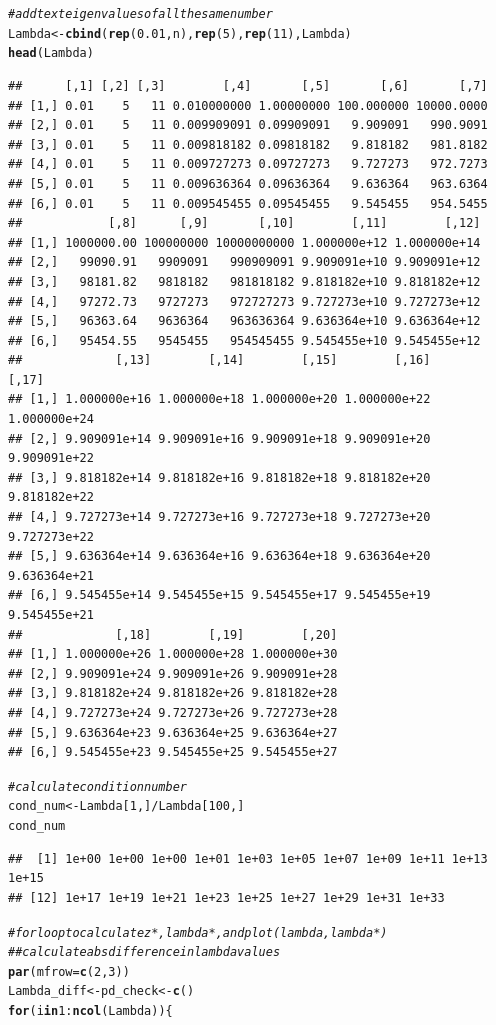 \documentclass{article}\usepackage[]{graphicx}\usepackage[]{color}
\makeatletter
\newcommand{\hlnum}[1]{\textcolor[rgb]{0.686,0.059,0.569}{#1}}%
\newcommand{\hlcom}[1]{\textcolor[rgb]{0.678,0.584,0.686}{\textit{#1}}}%
\newcommand{\hlopt}[1]{\textcolor[rgb]{0,0,0}{#1}}%
\newcommand{\hlstd}[1]{\textcolor[rgb]{0.345,0.345,0.345}{#1}}%
\newcommand{\hlkwa}[1]{\textcolor[rgb]{0.161,0.373,0.58}{\textbf{#1}}}%
\newcommand{\hlkwb}[1]{\textcolor[rgb]{0.69,0.353,0.396}{#1}}%
\newcommand{\hlkwc}[1]{\textcolor[rgb]{0.333,0.667,0.333}{#1}}%
\newcommand{\hlkwd}[1]{\textcolor[rgb]{0.737,0.353,0.396}{\textbf{#1}}}%
\newenvironment{kframe}{%
 \def\at@end@of@kframe{}%
 \ifinner\ifhmode%
  \def\at@end@of@kframe{\end{minipage}}%
  \begin{minipage}{\columnwidth}%
 \fi\fi%
 \def\FrameCommand##1{\hskip\@totalleftmargin \hskip-\fboxsep
 \colorbox{shadecolor}{##1}\hskip-\fboxsep
     \hskip-\linewidth \hskip-\@totalleftmargin \hskip\columnwidth}%
 \MakeFramed {\advance\hsize-\width
   \@totalleftmargin\z@ \linewidth\hsize
   \@setminipage}}%
 {\par\unskip\endMakeFramed%
 \at@end@of@kframe}
\newenvironment{knitrout}{}{} %
\makeatother
\begin{document}
\begin{knitrout}
\begin{kframe}
\begin{alltt}
\hlcom{#add text eigen values of all the same number}
\hlstd{Lambda} \hlkwb{<-} \hlkwd{cbind}\hlstd{(}\hlkwd{rep}\hlstd{(}\hlnum{0.01}\hlstd{, n),} \hlkwd{rep}\hlstd{(}\hlnum{5}\hlstd{),} \hlkwd{rep}\hlstd{(}\hlnum{11}\hlstd{), Lambda)}
\hlkwd{head}\hlstd{(Lambda)}
\end{alltt}
\begin{verbatim}
##      [,1] [,2] [,3]        [,4]       [,5]       [,6]       [,7]
## [1,] 0.01    5   11 0.010000000 1.00000000 100.000000 10000.0000
## [2,] 0.01    5   11 0.009909091 0.09909091   9.909091   990.9091
## [3,] 0.01    5   11 0.009818182 0.09818182   9.818182   981.8182
## [4,] 0.01    5   11 0.009727273 0.09727273   9.727273   972.7273
## [5,] 0.01    5   11 0.009636364 0.09636364   9.636364   963.6364
## [6,] 0.01    5   11 0.009545455 0.09545455   9.545455   954.5455
##            [,8]      [,9]       [,10]        [,11]        [,12]
## [1,] 1000000.00 100000000 10000000000 1.000000e+12 1.000000e+14
## [2,]   99090.91   9909091   990909091 9.909091e+10 9.909091e+12
## [3,]   98181.82   9818182   981818182 9.818182e+10 9.818182e+12
## [4,]   97272.73   9727273   972727273 9.727273e+10 9.727273e+12
## [5,]   96363.64   9636364   963636364 9.636364e+10 9.636364e+12
## [6,]   95454.55   9545455   954545455 9.545455e+10 9.545455e+12
##             [,13]        [,14]        [,15]        [,16]        [,17]
## [1,] 1.000000e+16 1.000000e+18 1.000000e+20 1.000000e+22 1.000000e+24
## [2,] 9.909091e+14 9.909091e+16 9.909091e+18 9.909091e+20 9.909091e+22
## [3,] 9.818182e+14 9.818182e+16 9.818182e+18 9.818182e+20 9.818182e+22
## [4,] 9.727273e+14 9.727273e+16 9.727273e+18 9.727273e+20 9.727273e+22
## [5,] 9.636364e+14 9.636364e+16 9.636364e+18 9.636364e+20 9.636364e+21
## [6,] 9.545455e+14 9.545455e+15 9.545455e+17 9.545455e+19 9.545455e+21
##             [,18]        [,19]        [,20]
## [1,] 1.000000e+26 1.000000e+28 1.000000e+30
## [2,] 9.909091e+24 9.909091e+26 9.909091e+28
## [3,] 9.818182e+24 9.818182e+26 9.818182e+28
## [4,] 9.727273e+24 9.727273e+26 9.727273e+28
## [5,] 9.636364e+23 9.636364e+25 9.636364e+27
## [6,] 9.545455e+23 9.545455e+25 9.545455e+27
\end{verbatim}
\begin{alltt}
\hlcom{#calculate condition  number}
\hlstd{cond_num} \hlkwb{<-} \hlstd{Lambda[}\hlnum{1}\hlstd{, ]} \hlopt{/} \hlstd{Lambda[}\hlnum{100}\hlstd{, ]}
\hlstd{cond_num}
\end{alltt}
\begin{verbatim}
##  [1] 1e+00 1e+00 1e+00 1e+01 1e+03 1e+05 1e+07 1e+09 1e+11 1e+13 1e+15
## [12] 1e+17 1e+19 1e+21 1e+23 1e+25 1e+27 1e+29 1e+31 1e+33
\end{verbatim}
\begin{alltt}
\hlcom{#for loop to calculate z*, lambda*, and plot(lambda, lambda*)}
\hlcom{##calculate abs difference in lambda values}
\hlkwd{par}\hlstd{(}\hlkwc{mfrow} \hlstd{=} \hlkwd{c}\hlstd{(}\hlnum{2}\hlstd{,} \hlnum{3}\hlstd{))}
\hlstd{Lambda_diff} \hlkwb{<-} \hlstd{pd_check} \hlkwb{<-} \hlkwd{c}\hlstd{()}
\hlkwa{for} \hlstd{(i} \hlkwa{in} \hlnum{1}\hlopt{:}\hlkwd{ncol}\hlstd{(Lambda)) \{}


\end{alltt}
\end{kframe}
\end{knitrout}
\end{document}
